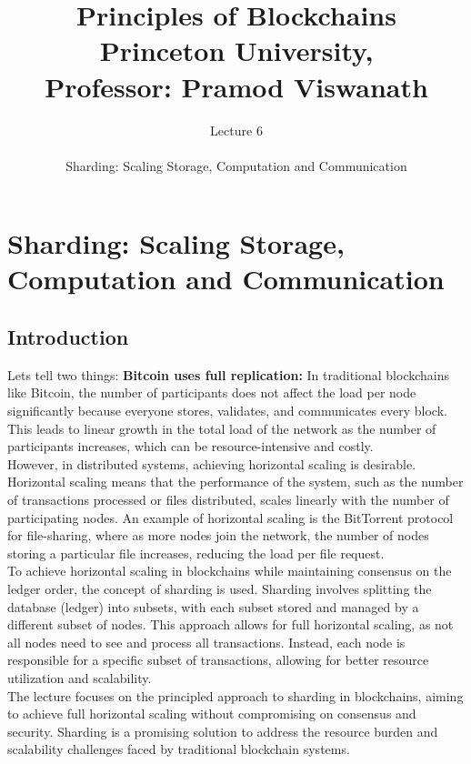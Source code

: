 \documentclass{report}
\title{\Huge{Principles of Blockchains \\ Princeton University,\\
		Professor: Pramod Viswanath}}
\author{\huge{Lecture 6} \\\\ Sharding: Scaling Storage, Computation and Communication}
\begin{document}
\maketitle
\newpage%
\tableofcontents
\pagebreak

\chapter{Sharding: Scaling Storage, Computation and Communication}

\section{Introduction}
Lets tell two things:
\textbf{Bitcoin uses full replication:} In traditional blockchains like Bitcoin, the number of participants does not affect the load per node significantly because everyone stores, validates, and communicates every block. This leads to linear growth in the total load of the network as the number of participants increases, which can be resource-intensive and costly.\\
However, in distributed systems, achieving horizontal scaling is desirable. Horizontal scaling means that the performance of the system, such as the number of transactions processed or files distributed, scales linearly with the number of participating nodes. An example of horizontal scaling is the BitTorrent protocol for file-sharing, where as more nodes join the network, the number of nodes storing a particular file increases, reducing the load per file request.\\
To achieve horizontal scaling in blockchains while maintaining consensus on the ledger order, the concept of sharding is used. Sharding involves splitting the database (ledger) into subsets, with each subset stored and managed by a different subset of nodes. This approach allows for full horizontal scaling, as not all nodes need to see and process all transactions. Instead, each node is responsible for a specific subset of transactions, allowing for better resource utilization and scalability.\\
The lecture focuses on the principled approach to sharding in blockchains, aiming to achieve full horizontal scaling without compromising on consensus and security. Sharding is a promising solution to address the resource burden and scalability challenges faced by traditional blockchain systems.\\
\end{document}
